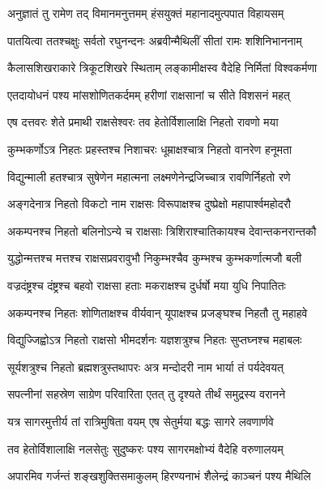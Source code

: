 
\twolineshloka
{अनुज्ञातं तु रामेण तद् विमानमनुत्तमम्}
{हंसयुक्तं महानादमुत्पपात विहायसम्} %

\twolineshloka
{पातयित्वा ततश्चक्षुः सर्वतो रघुनन्दनः}
{अब्रवीन्मैथिलीं सीतां रामः शशिनिभाननाम्} %

\twolineshloka
{कैलासशिखराकारे त्रिकूटशिखरे स्थिताम्}
{लङ्कामीक्षस्व वैदेहि निर्मितां विश्वकर्मणा} %

\twolineshloka
{एतदायोधनं पश्य मांसशोणितकर्दमम्}
{हरीणां राक्षसानां च सीते विशसनं महत्} %

\twolineshloka
{एष दत्तवरः शेते प्रमाथी राक्षसेश्वरः}
{तव हेतोर्विशालाक्षि निहतो रावणो मया} %

\twolineshloka
{कुम्भकर्णोऽत्र निहतः प्रहस्तश्च निशाचरः}
{धूम्राक्षश्चात्र निहतो वानरेण हनूमता} %

\twolineshloka
{विद्युन्माली हतश्चात्र सुषेणेन महात्मना}
{लक्ष्मणेनेन्द्रजिच्चात्र रावणिर्निहतो रणे} %

\twolineshloka
{अङ्गदेनात्र निहतो विकटो नाम राक्षसः}
{विरूपाक्षश्च दुष्प्रेक्षो महापार्श्वमहोदरौ} %

\twolineshloka
{अकम्पनश्च निहतो बलिनोऽन्ये च राक्षसाः}
{त्रिशिराश्चातिकायश्च देवान्तकनरान्तकौ} %

\twolineshloka
{युद्धोन्मत्तश्च मत्तश्च राक्षसप्रवरावुभौ}
{निकुम्भश्चैव कुम्भश्च कुम्भकर्णात्मजौ बली} %

\twolineshloka
{वज्रदंष्ट्रश्च दंष्ट्रश्च बहवो राक्षसा हताः}
{मकराक्षश्च दुर्धर्षो मया युधि निपातितः} %

\twolineshloka
{अकम्पनश्च निहतः शोणिताक्षश्च वीर्यवान्}
{यूपाक्षश्च प्रजङ्घश्च निहतौ तु महाहवे} %

\twolineshloka
{विद्युज्जिह्वोऽत्र निहतो राक्षसो भीमदर्शनः}
{यज्ञशत्रुश्च निहतः सुप्तघ्नश्च महाबलः} %

\twolineshloka
{सूर्यशत्रुश्च निहतो ब्रह्मशत्रुस्तथापरः}
{अत्र मन्दोदरी नाम भार्या तं पर्यदेवयत्} %

\twolineshloka
{सपत्नीनां सहस्रेण साग्रेण परिवारिता}
{एतत् तु दृश्यते तीर्थं समुद्रस्य वरानने} %

\twolineshloka
{यत्र सागरमुत्तीर्य तां रात्रिमुषिता वयम्}
{एष सेतुर्मया बद्धः सागरे लवणार्णवे} %

\twolineshloka
{तव हेतोर्विशालाक्षि नलसेतुः सुदुष्करः}
{पश्य सागरमक्षोभ्यं वैदेहि वरुणालयम्} %

\twolineshloka
{अपारमिव गर्जन्तं शङ्खशुक्तिसमाकुलम्}
{हिरण्यनाभं शैलेन्द्रं काञ्चनं पश्य मैथिलि} %

